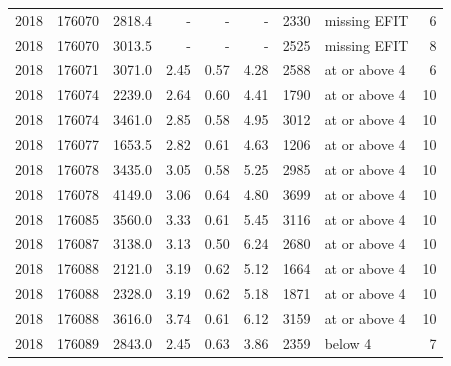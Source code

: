 \begin{longtable}{@{}rrrrrrrlr@{}}
2018 & 176070 & 2818.4 & - & - & - & 2330 & missing EFIT & 6 \\
2018 & 176070 & 3013.5 & - & - & - & 2525 & missing EFIT & 8 \\
2018 & 176071 & 3071.0 & 2.45 & 0.57 & 4.28 & 2588 & at or above 4 & 6 \\
2018 & 176074 & 2239.0 & 2.64 & 0.60 & 4.41 & 1790 & at or above 4 & 10 \\
2018 & 176074 & 3461.0 & 2.85 & 0.58 & 4.95 & 3012 & at or above 4 & 10 \\
2018 & 176077 & 1653.5 & 2.82 & 0.61 & 4.63 & 1206 & at or above 4 & 10 \\
2018 & 176078 & 3435.0 & 3.05 & 0.58 & 5.25 & 2985 & at or above 4 & 10 \\
2018 & 176078 & 4149.0 & 3.06 & 0.64 & 4.80 & 3699 & at or above 4 & 10 \\
2018 & 176085 & 3560.0 & 3.33 & 0.61 & 5.45 & 3116 & at or above 4 & 10 \\
2018 & 176087 & 3138.0 & 3.13 & 0.50 & 6.24 & 2680 & at or above 4 & 10 \\
2018 & 176088 & 2121.0 & 3.19 & 0.62 & 5.12 & 1664 & at or above 4 & 10 \\
2018 & 176088 & 2328.0 & 3.19 & 0.62 & 5.18 & 1871 & at or above 4 & 10 \\
2018 & 176088 & 3616.0 & 3.74 & 0.61 & 6.12 & 3159 & at or above 4 & 10 \\
2018 & 176089 & 2843.0 & 2.45 & 0.63 & 3.86 & 2359 & below 4 & 7 \\
\end{longtable}
\endgroup
